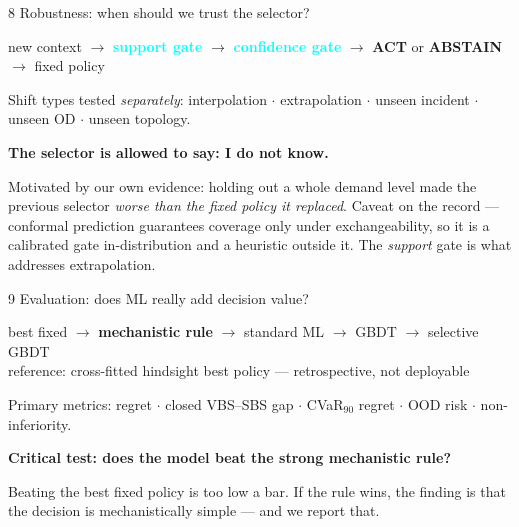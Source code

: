 \documentclass[aspectratio=169,10pt]{beamer}
\newcommand{\aside}[1]{\vspace{2mm}\par{\footnotesize\color{muted}#1}}
\newcommand{\keymsg}[1]{\vspace{2mm}\begin{beamercolorbox}[wd=\textwidth,sep=2mm]{}\color{orange}\bfseries #1\end{beamercolorbox}}
\begin{document}
\begin{frame}{8 \quad Robustness: when should we trust the selector?}
\begin{center}
new context $\rightarrow$ \textcolor{aqua}{\bfseries support gate} $\rightarrow$
\textcolor{aqua}{\bfseries confidence gate} $\rightarrow$ \textbf{ACT} \quad or \quad
\textbf{ABSTAIN} $\rightarrow$ fixed policy
\end{center}
\vspace{2mm}
Shift types tested \emph{separately}: interpolation $\cdot$ extrapolation $\cdot$ unseen incident
$\cdot$ unseen OD $\cdot$ unseen topology.
\keymsg{The selector is allowed to say: I do not know.}
\aside{Motivated by our own evidence: holding out a whole demand level made the previous selector
\emph{worse than the fixed policy it replaced}. Caveat on the record --- conformal prediction
guarantees coverage only under exchangeability, so it is a calibrated gate in-distribution and a
heuristic outside it. The \emph{support} gate is what addresses extrapolation.}
\end{frame}

\begin{frame}{9 \quad Evaluation: does ML really add decision value?}
\begin{center}
best fixed $\rightarrow$ \textbf{mechanistic rule} $\rightarrow$ standard ML $\rightarrow$
GBDT $\rightarrow$ selective GBDT\\[1mm]
{\footnotesize\color{muted} reference: cross-fitted hindsight best policy --- retrospective, not deployable}
\end{center}
\vspace{2mm}
Primary metrics: regret $\cdot$ closed VBS--SBS gap $\cdot$ CVaR$_{90}$ regret $\cdot$ OOD risk
$\cdot$ non-inferiority.
\keymsg{Critical test: does the model beat the strong mechanistic rule?}
\aside{Beating the best fixed policy is too low a bar. If the rule wins, the finding is that the
decision is mechanistically simple --- and we report that.}
\end{frame}
\end{document}
